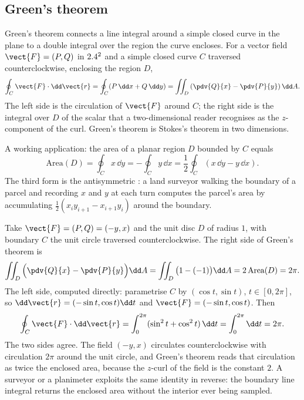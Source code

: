 \subsection{Green's theorem}

Green's theorem connects a line integral around a simple closed curve
in the plane to a double integral over the region the curve encloses.
For a vector field $\vect{F} = (P, Q)$ in $2.4^{2}$ and a simple
closed curve $C$ traversed counterclockwise, enclosing the region
$D$,
\[
\oint_{C} \vect{F} \cdot \dd\vect{r} =
\oint_{C} (P \,\dd x + Q \,\dd y) =
\iint_{D} \left(\pdv{Q}{x} - \pdv{P}{y}\right) \dd A.
\]
The left side is the circulation of $\vect{F}$ around $C$; the right
side is the integral over $D$ of the scalar that a two-dimensional
reader recognises as the $z$-component of the curl. Green's theorem
is Stokes's theorem in two dimensions.

A working application: the area of a planar region $D$ bounded by
$C$ equals
\[
\text{Area}(D) = \oint_{C} x \,\dd y = -\oint_{C} y \,\dd x =
\frac{1}{2}\oint_{C} (x \,\dd y - y \,\dd x).
\]
The third form is the antisymmetric : a
land surveyor walking the boundary of a parcel and recording $x$ and
$y$ at each turn computes the parcel's area by accumulating
$\tfrac{1}{2}(x_{i} y_{i+1} - x_{i+1} y_{i})$ around the boundary.

\begin{example}
Take $\vect{F} = (P, Q) = (-y, x)$ and the unit disc $D$ of radius
$1$, with boundary $C$ the unit circle traversed counterclockwise.
The right side of Green's theorem is
\[
\iint_{D}\Big(\pdv{Q}{x} - \pdv{P}{y}\Big)\dd A =
\iint_{D}\big(1 - (-1)\big)\dd A = 2\,\text{Area}(D) = 2\pi.
\]
The left side, computed directly: parametrise $C$ by $(\cos t,
\sin t)$, $t \in [0, 2\pi]$, so $\dd\vect{r} = (-\sin t, \cos t)\dd t$
and $\vect{F} = (-\sin t, \cos t)$. Then
\[
\oint_{C}\vect{F}\cdot\dd\vect{r} = \int_{0}^{2\pi}(\sin^{2} t +
\cos^{2} t)\,\dd t = \int_{0}^{2\pi}\dd t = 2\pi.
\]
The two sides agree. The field $(-y, x)$ circulates counterclockwise
with circulation $2\pi$ around the unit circle, and Green's theorem
reads that circulation as twice the enclosed area, because the
$z$-curl of the field is the constant $2$. A surveyor or a planimeter
exploits the same identity in reverse: the boundary line integral
returns the enclosed area without the interior ever being sampled.
\end{example}

